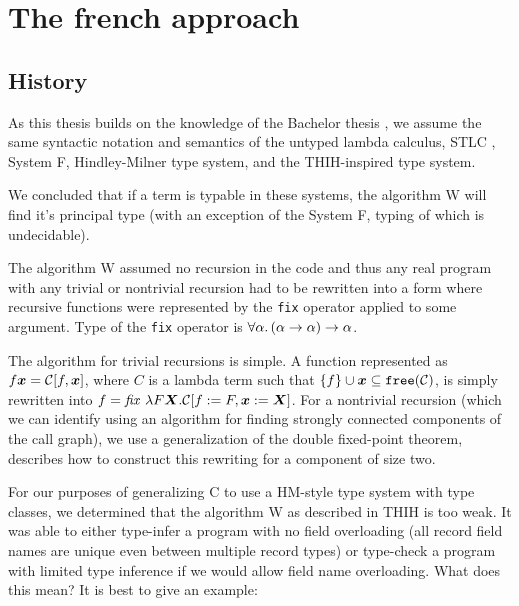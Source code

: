 \providecommand{\free}[1]{\mtt{free} (#1)}
\providecommand{\dom}[1]{\mtt{Dom} (#1)}
\providecommand{\ran}[1]{\mtt{Ran} (#1)}

\providecommand{\bmath}[1]{\boldsymbol{#1}}

\chapter{The french approach}


\section{History }

As this thesis builds on the knowledge of the Bachelor thesis , we assume the same syntactic notation and semantics of the untyped lambda calculus, STLC , System F, Hindley-Milner type system, and the THIH-inspired type system.

We concluded that if a term is typable in these systems, the algorithm W will find it's principal type (with an exception of the System F, typing of which is undecidable).

The algorithm W assumed no recursion in the code and thus any real program with any trivial or nontrivial recursion had to be rewritten into a form where recursive functions were represented by the \lstinline{fix} operator applied to some argument. Type of the \lstinline{fix} operator is $\forall \alpha . \left(\alpha \to \alpha\right) \to \alpha$.

The algorithm for trivial recursions is simple. A function represented as $f \bmath{x} = \calC[f, \bmath{x}]$, where $C$ is a lambda term such that $\{f\} \cup \bmath{x} \subseteq \free \calC$, is simply rewritten into $f = \mathit{fix}\ \lambda F \bmath{X} .\calC[f := F, \bmath{x} := \bmath{X}]$. For a nontrivial recursion (which we can identify using an algorithm for finding strongly connected components of the call graph), we use a generalization of the double fixed-point  theorem, describes how to construct this rewriting for a component of size two.

For our purposes of generalizing C to use a HM-style type system with type classes, we determined that the algorithm W as described in THIH is too weak. It was able to either type-infer a program with no field overloading (all record field names are unique even between multiple record types) or type-check a program with limited type inference if we would allow field name overloading. What does this mean? It is best to give an example:

